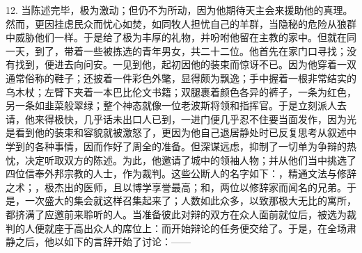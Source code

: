 12. 当陈述完毕，极为激动；但仍不为所动，因为他期待天主会来援助他的真理。然而，更因挂虑民众而忧心如焚，如同牧人担忧自己的羊群，当隐秘的危险从狼群中威胁他们一样。于是给了极为丰厚的礼物，并吩咐他留在主教的家中。但就在同一天，到了，带着一些被拣选的青年男女，共二十二位。他首先在家门口寻找；没有找到，便进去向问安。一见到他，起初因他的装束而惊讶不已。因为他穿着一双通常俗称的鞋子；还披着一件彩色外氅，显得颇为飘逸；手中握着一根非常结实的乌木杖；左臂下夹着一本巴比伦文书籍；双腿裹着颜色各异的裤子，一条为红色，另一条如韭菜般翠绿；整个神态就像一位老波斯将领和指挥官。于是立刻派人去请，他来得极快，几乎话未出口人已到，一进门便几乎忍不住要当面发作，因为光是看到他的装束和容貌就被激怒了，更因为他自己退居静处时已反复思考从叙述中学到的各种事情，因而作好了周全的准备。但深谋远虑，抑制了一切单为争辩的热忱，决定听取双方的陈述。为此，他邀请了城中的领袖人物；并从他们当中挑选了四位信奉外邦宗教的人士，作为裁判。这些公断人的名字如下：，精通文法与修辞之术；，极杰出的医师，且以博学享誉最高；和，两位以修辞家而闻名的兄弟。于是，一次盛大的集会就这样召集起来了；人数如此众多，以致那极大无比的寓所，都挤满了应邀前来聆听的人。当准备彼此对辩的双方在众人面前就位后，被选为裁判的人便就座于高出众人的席位上：而开始辩论的任务便交给了。于是，在全场肃静之后，他以如下的言辞开始了讨论：——\par

